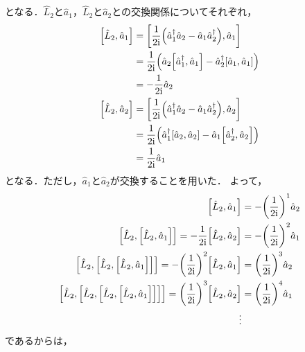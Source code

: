 \documentclass{report}
\begin{document}
    となる．$\hat{L}_2$と$\hat{a}_1$，$\hat{L}_2$と$\hat{a}_2$との交換関係についてそれぞれ，
    \begin{align}
      \qty[\hat{L}_2, \hat{a}_1] &= \qty[\frac{1}{2\mathrm{i}}\qty(\hat{a}_1^{\dag}\hat{a}_2 - \hat{a}_1\hat{a}_2^{\dag}), \hat{a}_1] \\ 
      &= \frac{1}{2\mathrm{i}}\qty(\hat{a}_2\qty[\hat{a}_1^{\dag}, \hat{a}_1] - \hat{a}_2^{\dag}\qty[\hat{a}_1, \hat{a}_1]) \\ 
      &= -\frac{1}{2\mathrm{i}}\hat{a}_2 \label{commute-l2a1}\\ 
      \qty[\hat{L}_2, \hat{a}_2] &= \qty[\frac{1}{2\mathrm{i}}\qty(\hat{a}_1^{\dag}\hat{a}_2 - \hat{a}_1\hat{a}_2^{\dag}), \hat{a}_2] \\ 
      &= \frac{1}{2\mathrm{i}}\qty(\hat{a}_1^{\dag}\qty[\hat{a}_2, \hat{a}_2] - \hat{a}_1\qty[\hat{a}_2^{\dag}, \hat{a}_2]) \\ 
      &= \frac{1}{2\mathrm{i}}\hat{a}_1 \label{commute-l2a2}
    \end{align}
    となる．ただし，$\hat{a}_1$と$\hat{a}_2$が交換することを用いた．
    よって，
    \begin{align}
      \qty[\hat{L}_2, \hat{a}_1] &= -\qty(\frac{1}{2\mathrm{i}})^1\hat{a}_2 \\ 
      \qty[\hat{L}_2, \qty[\hat{L}_2, \hat{a}_1]] = -\frac{1}{2\mathrm{i}}\qty[\hat{L}_2, \hat{a}_2] &= -\qty(\frac{1}{2\mathrm{i}})^2\hat{a}_1 \\ 
      \qty[\hat{L}_2, \qty[\hat{L}_2, \qty[\hat{L}_2, \hat{a}_1]]] = -\qty(\frac{1}{2\mathrm{i}})^2\qty[\hat{L}_2, \hat{a}_1] &= \qty(\frac{1}{2\mathrm{i}})^3\hat{a}_2 \\ 
      \qty[\hat{L}_2, \qty[\hat{L}_2, \qty[\hat{L}_2, \qty[\hat{L}_2, \hat{a}_1]]]] = \qty(\frac{1}{2\mathrm{i}})^3\qty[\hat{L}_2, \hat{a}_2] &= \qty(\frac{1}{2\mathrm{i}})^4\hat{a}_1 \\ 
      \vdots & 
    \end{align}
    であるからは，
\end{document}
